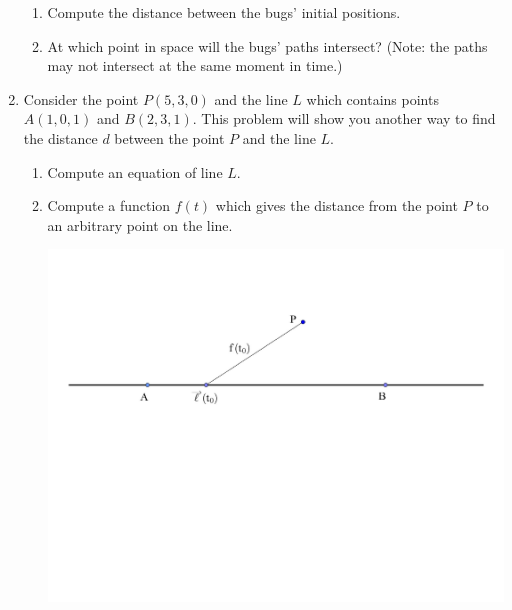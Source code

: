 \documentclass[12pt]{article}
\newif\ifans
\begin{document}
\begin{enumerate}
\begin{enumerate}

\item Compute the distance between the bugs' initial positions.

\ifans{\fbox{\parbox{1\linewidth}{Bug 1's initial position is $(x,y,z)=(1,3,5)$ and Bug 2's initial position is $(x,y,z)=(0,11,4)$.  The distance between these two points is $\sqrt{66}$}}} \fi

\item At which point in space will the bugs' paths intersect?  (Note: the paths may not intersect at the same moment in time.)

\ifans{\fbox{The paths intersect at the point $(x,y,z)=(3,8,7)$}} \fi

\end{enumerate}

\item Consider the point $P(5,3,0)$ and the line $L$ which contains points $A(1,0,1)$ and $B(2,3,1)$. This problem will show you another way to find the distance $d$ between the point $P$ and the line $L$.

\begin{enumerate}

\item Compute an equation of line $L$.

\ifans{\fbox{$\overrightarrow{\ell} (t) = \langle 1+t, 3t,1 \rangle$}} \fi

\item Compute a function $f(t)$ which gives the distance from the point $P$ to an arbitrary point on the line.  

\begin{center}
\includegraphics[scale=0.5]{distance.pdf}
\end{center}


\end{enumerate}
\end{enumerate}
\end{document}
